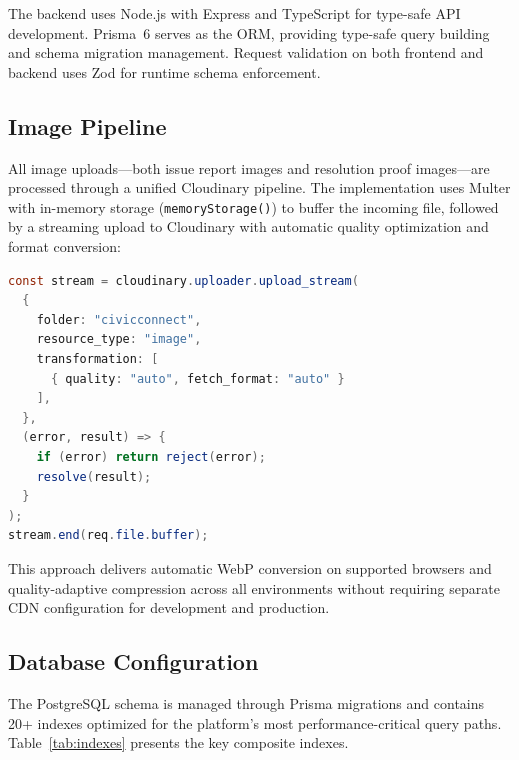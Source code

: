 \documentclass[conference]{IEEEtran}
\begin{document}
The backend uses Node.js with Express and TypeScript for type-safe API development. Prisma~6 serves as the ORM, providing type-safe query building and schema migration management. Request validation on both frontend and backend uses Zod for runtime schema enforcement.

\subsection{Image Pipeline}

All image uploads---both issue report images and resolution proof images---are processed through a unified Cloudinary pipeline. The implementation uses Multer with in-memory storage (\texttt{memoryStorage()}) to buffer the incoming file, followed by a streaming upload to Cloudinary with automatic quality optimization and format conversion:

\begin{lstlisting}[language=Java, caption={Cloudinary stream upload middleware}]
const stream = cloudinary.uploader.upload_stream(
  {
    folder: "civicconnect",
    resource_type: "image",
    transformation: [
      { quality: "auto", fetch_format: "auto" }
    ],
  },
  (error, result) => {
    if (error) return reject(error);
    resolve(result);
  }
);
stream.end(req.file.buffer);
\end{lstlisting}

This approach delivers automatic WebP conversion on supported browsers and quality-adaptive compression across all environments without requiring separate CDN configuration for development and production.

\subsection{Database Configuration}

The PostgreSQL schema is managed through Prisma migrations and contains 20+ indexes optimized for the platform's most performance-critical query paths. Table~\ref{tab:indexes} presents the key composite indexes.
\end{document}

